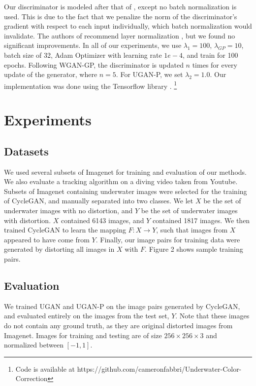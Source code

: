 \documentclass[conference,reqno]{IEEEtran}
\begin{document}
Our discriminator is modeled after that of \cite{radford2015unsupervised}, except no batch normalization is used. This
is due to the fact that we penalize the norm of the discriminator's gradient with respect to each input individually,
which batch normalization would invalidate. The authors of \cite{gulrajani2017improved} recommend layer normalization
\cite{ba2016layer}, but we found no significant improvements. In all of our experiments, we use $\lambda_{1} = 100$,
$\lambda_{GP} = 10$, batch size of 32, Adam Optimizer \cite{kingma2014adam} with learning rate $1e-4$, and train for 100 epochs.
Following WGAN-GP, the discriminator is updated $n$ times for every update of the generator, where $n = 5$.
For UGAN-P, we set $\lambda_{2} = 1.0$.
Our implementation was done using the Tensorflow library \cite{abadi2016tensorflow}.
\footnote{Code is available at https://github.com/cameronfabbri/Underwater-Color-Correction}

\section{Experiments}
\subsection{Datasets}
We used several subsets of Imagenet \cite{deng2009imagenet} for training and evaluation of our methods. We also
evaluate a tracking algorithm on a diving video taken from Youtube. Subsets of Imagenet containing underwater images
were selected for the training of CycleGAN, and manually separated into two classes. We let $X$ be the set of
underwater images with no distortion, and $Y$ be the set of underwater images with distortion. $X$ contained 6143
images, and $Y$ contained 1817 images. We then trained CycleGAN to learn the mapping $F: X \rightarrow Y$, such that
images from $X$ appeared to have come from $Y$. Finally, our image pairs for training data were generated by distorting
all images in $X$ with $F$. Figure 2 shows sample training pairs.

\subsection{Evaluation}
We trained UGAN and UGAN-P on the image pairs generated by CycleGAN, and evaluated entirely on the images from the
test set, $Y$. Note that these images do not contain any ground truth, as they are original distorted images from
Imagenet. Images for training and testing are of size $256 \times 256 \times 3$ and normalized between $[-1, 1]$.
\end{document}
